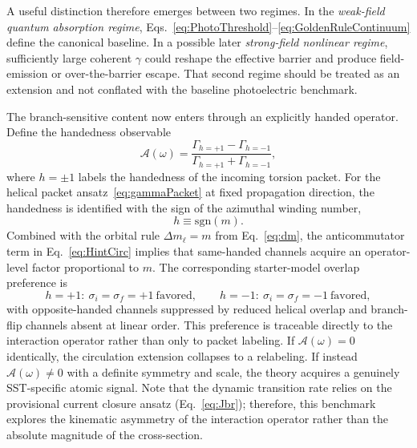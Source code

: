 \documentclass[11pt,a4paper]{article}
\begin{document}
    A useful distinction therefore emerges between two regimes. In the \emph{weak-field quantum absorption regime}, Eqs.~\eqref{eq:PhotoThreshold}--\eqref{eq:GoldenRuleContinuum} define the canonical baseline. In a possible later \emph{strong-field nonlinear regime}, sufficiently large coherent $\gamma$ could reshape the effective barrier and produce field-emission or over-the-barrier escape. That second regime should be treated as an extension and not conflated with the baseline photoelectric benchmark.
    
    The branch-sensitive content now enters through an explicitly handed operator. Define the handedness observable
    \begin{equation}
        \label{eq:Asymmetry}
        \boxed{
            \mathcal A(\omega)
            =
            \frac{\Gamma_{h=+1}-\Gamma_{h=-1}}{\Gamma_{h=+1}+\Gamma_{h=-1}},
        }
    \end{equation}
    where $h=\pm 1$ labels the handedness of the incoming torsion packet. For the helical packet ansatz~\eqref{eq:gammaPacket} at fixed propagation direction, the handedness is identified with the sign of the azimuthal winding number,
    \begin{equation}
        \label{eq:h-sign-m}
        \boxed{h\equiv \mathrm{sgn}(m).}
    \end{equation}
    Combined with the orbital rule $\Delta m_\ell=m$ from Eq.~\eqref{eq:dm}, the anticommutator term in Eq.~\eqref{eq:HintCirc} implies that same-handed channels acquire an operator-level factor proportional to $m$. The corresponding starter-model overlap preference is
    \begin{equation}
        \label{eq:handed-selection}
        h=+1:\ \sigma_i=\sigma_f=+1\ \text{favored},
        \qquad
        h=-1:\ \sigma_i=\sigma_f=-1\ \text{favored},
    \end{equation}
    with opposite-handed channels suppressed by reduced helical overlap and branch-flip channels absent at linear order. This preference is traceable directly to the interaction operator rather than only to packet labeling. If $\mathcal A(\omega)=0$ identically, the circulation extension collapses to a relabeling. If instead $\mathcal A(\omega)\neq 0$ with a definite symmetry and scale, the theory acquires a genuinely SST-specific atomic signal. Note that the dynamic transition rate relies on the provisional current closure ansatz (Eq.~\eqref{eq:Jbr}); therefore, this benchmark explores the kinematic asymmetry of the interaction operator rather than the absolute magnitude of the cross-section.
    
\end{document}
